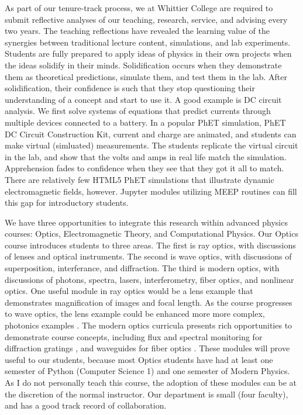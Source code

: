 \documentclass[../../main.tex]{subfiles}
\begin{document}
As part of our tenure-track process, we at Whittier College are required to submit reflective analyses of our teaching, research, service, and advising every two years.  The teaching reflections have revealed the learning value of the synergies between traditional lecture content, simulations, and lab experiments.  Students are fully prepared to apply ideas of physics in their own projects when the ideas solidify in their minds.  Solidification occurs when they demonstrate them as theoretical predictions, simulate them, and test them in the lab.  After solidification, their confidence is such that they stop questioning their understanding of a concept and start to use it.  A good example is DC circuit analysis.  We first solve systems of equations that predict currents through multiple devices connected to a battery.  In a popular PhET simulation, PhET DC Circuit Construction Kit, current and charge are animated, and students can make virtual (simluated) measurements.  The students replicate the virtual circuit in the lab, and show that the volts and amps in real life match the simulation.  Apprehension fades to confidence when they see that they got it all to match.  There are relatively few HTML5 PhET simulations that illustrate dynamic electromagnetic fields, however.  Jupyter modules utilizing MEEP routines can fill this gap for introductory students. \\ \vspace{2.5mm}

We have three opportunities to integrate this research within advanced physics courses: Optics, Electromagnetic Theory, and Computational Physics.  Our Optics course introduces students to three areas.  The first is ray optics, with discussions of lenses and optical instruments.  The second is wave optics, with discussions of superposition, interferance, and diffraction. The third is modern optics, with discussions of photons, spectra, lasers, interferometry, fiber optics, and nonlinear optics.  One useful module in ray optics would be a lens example that demonstrates magnification of images and focal length.  As the course progresses to wave optics, the lens example could be enhanced more more complex, photonics examples \cite{meepcon2022_3}.  The modern optics curricula presents rich opportunities to demonstrate course concepts, including flux and spectral monitoring for diffraction gratings \cite{meepcon2022_4}, and waveguides for fiber optics \cite{meepcon2022_5}.  These modules will prove useful to our students, because most Optics students have had at least one semester of Python (Computer Science 1) and one semester of Modern Physics.  As I do not personally teach this course, the adoption of these modules can be at the discretion of the normal instructor.  Our department is small (four faculty), and has a good track record of collaboration.  \\ \vspace{2.5mm}
\end{document}
